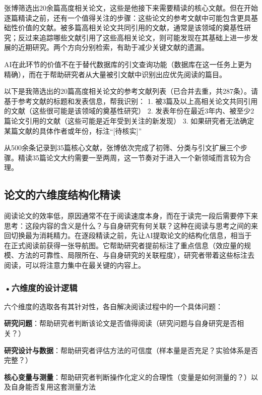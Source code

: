张博筛选出20余篇高度相关论文，这些是他接下来需要精读的核心文献。但在开始逐篇精读之前，还有一个值得关注的步骤：这些论文的参考文献中可能包含更具基础性价值的文献。被多篇高相关论文共同引用的文献，通常是该领域的奠基性研究；反过来追踪哪些文献引用了这些高相关论文，则可能发现在其基础上进一步发展的近期研究。两个方向分别检索，有助于减少关键文献的遗漏。

AI在此环节的价值不在于替代数据库的引文查询功能（数据库在这一任务上更为精确），而在于帮助研究者从大量被引文献中识别出应优先阅读的篇目。

\begin{userbox}
以下是我筛选出的20篇高度相关论文的参考文献列表（已合并去重，共287条）。请基于参考文献的标题和发表信息，帮我识别：
1. 被3篇及以上高相关论文共同引用的文献（这些很可能是该领域的奠基性研究）
2. 发表年份在最近3年内、被至少2篇论文引用的文献（这些可能是近年受到关注的新发现）
3. 如果研究者无法确定某篇文献的具体作者或年份，标注``[待核实]''
\end{userbox}

从500余条记录到35篇核心文献，张博依次完成了初筛、分类与引文扩展三个步骤。精读35篇论文大约需要一至两周，这一节奏对于进入一个新领域而言较为合理。

\subsection{论文的六维度结构化精读}

阅读论文的效率低，原因通常不在于阅读速度本身，而在于读完一段后需要停下来思考：这段内容的含义是什么？与自身研究有何关联？这种在阅读与思考之间的来回切换最为消耗精力。在逐段精读之前，先让AI提取论文的结构化信息，相当于在正式阅读前获得一张导航图。它帮助研究者提前标注了重点信息（效应量的规模、方法的可靠性、局限所在、与自身研究的关联程度），研究者带着这些标注去阅读，可以将注意力集中在最关键的内容上。

\subsubsection*{\textbf{•六维度的设计逻辑}}六个维度的选取各有其针对性，各自解决阅读过程中的一个具体问题：

\textbf{研究问题}：帮助研究者判断该论文是否值得阅读（研究问题与自身研究是否相关？）

\textbf{研究设计与数据}：帮助研究者评估方法的可信度（样本量是否充足？实验体系是否完整？）

\textbf{核心变量与测量}：帮助研究者判断操作化定义的合理性（变量是如何测量的？）以及自身能否复用这套测量方法

